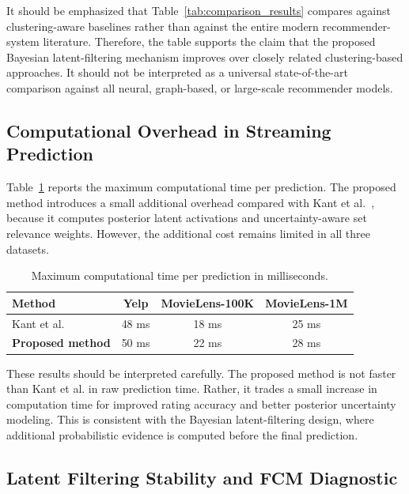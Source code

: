 \documentclass{article}
\theoremstyle{plain}
\theoremstyle{definition}
\theoremstyle{remark}
\begin{document}
It should be emphasized that Table~\ref{tab:comparison_results} compares against clustering-aware baselines rather than against the entire modern recommender-system literature. Therefore, the table supports the claim that the proposed Bayesian latent-filtering mechanism improves over closely related clustering-based approaches. It should not be interpreted as a universal state-of-the-art comparison against all neural, graph-based, or large-scale recommender models.

\subsection{Computational Overhead in Streaming Prediction}
\label{subsec:computation_time}

Table~\ref{tab:computation_time} reports the maximum computational time per prediction. The proposed method introduces a small additional overhead compared with Kant et al.~\cite{kant2017leaderrank}, because it computes posterior latent activations and uncertainty-aware set relevance weights. However, the additional cost remains limited in all three datasets.

\begin{table}[h]
	\centering
	\caption{Maximum computational time per prediction in milliseconds.}
	\label{tab:computation_time}
	\renewcommand{\arraystretch}{1.3}
	\begin{tabular}{lccc}
		\hline
		\textbf{Method} & \textbf{Yelp} & \textbf{MovieLens-100K} & \textbf{MovieLens-1M} \\
		\hline
		Kant et al.~\cite{kant2017leaderrank} & 48 ms & 18 ms & 25 ms \\
		\textbf{Proposed method} & 50 ms & 22 ms & 28 ms \\
		\hline
	\end{tabular}
\end{table}

These results should be interpreted carefully. The proposed method is not faster than Kant et al. in raw prediction time. Rather, it trades a small increase in computation time for improved rating accuracy and better posterior uncertainty modeling. This is consistent with the Bayesian latent-filtering design, where additional probabilistic evidence is computed before the final prediction.

\subsection{Latent Filtering Stability and FCM Diagnostic}
\label{subsec:fcm_diagnostic}
\end{document}
